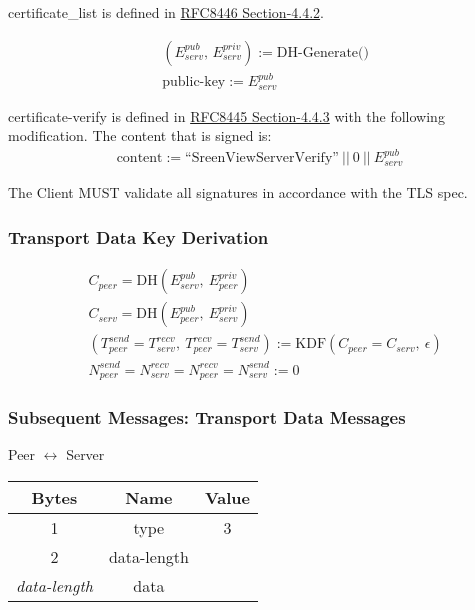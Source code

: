 \documentclass{article}
\begin{document}
    certificate\_list is defined in \href{https://datatracker.ietf.org/doc/html/rfc8446#section-4.4.2}{RFC8446
    Section-4.4.2}.

    \begin{align*}
        & (E_{serv}^{pub},\, E_{serv}^{priv}) := \text{DH-Generate()}\\
        & \text{public-key} := E_{serv}^{pub}
    \end{align*}

    certificate-verify is defined in \href{https://datatracker.ietf.org/doc/html/rfc8446#section-4.4
.3}{RFC8445 Section-4.4.3} with the following modification. The content that is signed is:\\

    \begin{align*}
        \text{content} := \text{``SreenViewServerVerify''}\ ||\ 0\ ||\ E_{serv}^{pub}
    \end{align*}

    The Client MUST validate all signatures in accordance with the TLS spec.

    \subsubsection{Transport Data Key Derivation}

    \begin{align*}
        & C_{peer} = \text{DH}(E_{serv}^{pub},\ E_{peer}^{priv})\\
        & C_{serv} = \text{DH}(E_{peer}^{pub},\ E_{serv}^{priv})\\
        & (T_{peer}^{send} = T_{serv}^{recv},\ T_{peer}^{recv} = T_{serv}^{send}) := \text{KDF}(C_{peer} = C_{serv},
        \ \epsilon) \\
        & N_{peer}^{send} = N_{serv}^{recv} = N_{peer}^{recv} = N_{serv}^{send} := 0
    \end{align*}

    \subsubsection{Subsequent Messages: Transport Data Messages}

    \begin{center}
        Peer $\leftrightarrow$ Server\\
        \begin{tabular}{|c|c|c|}
            \hline
            \textbf{Bytes}     & \textbf{Name} & \textbf{Value} \\
            \hline
            1                  & type          & 3              \\
            \hline
            2                  & data-length   &                \\
            \hline
            \emph{data-length} & data          &                \\
            \hline
        \end{tabular}
    \end{center}
\end{document}
